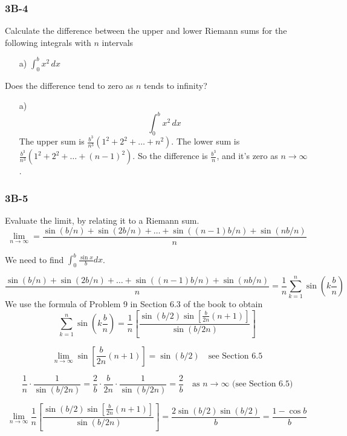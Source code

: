\documentclass{article}
\begin{document}
\subsubsection{3B-4}
\begin{tcolorbox}
    Calculate the difference between the upper and lower Riemann sums for the following integrals with $n$ intervals
    \begin{itemize}
        \item[a)] $\int_{0}^b{x^2 \, dx}$
    \end{itemize}
    \par Does the difference tend to zero as $n$ tends to infinity? 
\end{tcolorbox}
\begin{itemize}
    \item[a)] 
    \[ \int_{0}^b{x^2 \, dx} \]
    The upper sum is $\frac{b^3}{n^3} \left( 1^2 + 2^2 + \dots +  n^2 \right)$. The lower sum is $\frac{b^3}{n^3} \left( 1^2 + 2^2 + \dots +  (n-1)^2 \right)$. So the difference is $\frac{b^3}{n}$, and it's zero as $n \to \infty$.
\end{itemize}

\subsubsection{3B-5}
\begin{tcolorbox}
    Evaluate the limit, by relating it to a Riemann sum.
    \[ \lim_{n \to \infty} = \frac{\sin{(b/n)} + \sin{(2b/n)} + \dots + \sin{((n-1)b/n)} + \sin{(nb/n)}}{n} \]
\end{tcolorbox}
We need to find $\int_{0}^b{\frac{\sin{x}}{b}dx}$.


\[ \frac{\sin{(b/n)} + \sin{(2b/n)} + \dots + \sin{((n-1)b/n)} + \sin{(nb/n)}}{n} = \frac{1}{n} \sum\limits_{k=1}^n \sin{(k\frac{b}{n})} \]
We use the formula of Problem 9 in Section 6.3 of the book to obtain
\[ \sum\limits_{k=1}^n \sin{(k\frac{b}{n})} = \frac{1}{n} \left[ \frac{\sin{(b/2)}\sin{\left[ \frac{b}{2n}(n+1) \right]}}{\sin{(b/2n)}}\right] \]

\[ \lim_{n \to \infty} \sin{\left[ \frac{b}{2n}(n+1) \right]} = \sin{(b/2)} \quad \text{see Section 6.5} \]

\[ \frac{1}{n} \cdot \frac{1}{\sin{(b/2n)}} = \frac{2}{b} \cdot \frac{b}{2n} \cdot \frac{1}{\sin{(b/2n)}} = \frac{2}{b} \quad \text{as $n \to \infty$ (see Section 6.5)} \]

\[ \lim_{n \to \infty} \frac{1}{n} \left[ \frac{\sin{(b/2)}\sin{\left[ \frac{b}{2n}(n+1) \right]}}{\sin{(b/2n)}}\right] = \frac{2 \sin{(b/2)}\sin{(b/2)}}{b} = \frac{1 - \cos{b}}{b} \]
\end{document}
